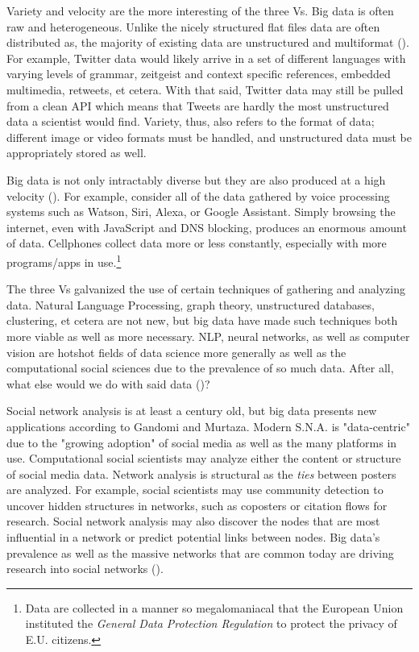 \documentclass[12pt, a4paper]{article}
\begin{document}
Variety and velocity are the more interesting of the three Vs. Big data is often raw and heterogeneous. Unlike the nicely structured flat files data are often distributed as, the majority of existing data are unstructured and multiformat (\cite{gandomiamir2015}). For example, Twitter data would likely arrive in a set of different languages with varying levels of grammar, zeitgeist and context specific references, embedded multimedia, retweets, et cetera. With that said, Twitter data may still be pulled from a clean API which means that Tweets are hardly the most unstructured data a scientist would find. Variety, thus, also refers to the format of data; different image or video formats must be handled, and unstructured data must be appropriately stored as well.

Big data is not only intractably diverse but they are also produced at a high velocity (\cite{gandomiamir2015}). For example, consider all of the data gathered by voice processing systems such as Watson, Siri, Alexa, or Google Assistant. Simply browsing the internet, even with JavaScript and DNS blocking, produces an enormous amount of data. Cellphones collect data more or less constantly, especially with more programs/apps in use.\footnote{Data are collected in a manner so megalomaniacal that the European Union instituted the \textit{General Data Protection Regulation} to protect the privacy of E.U. citizens.}

The three Vs galvanized the use of certain techniques of gathering and analyzing data. Natural Language Processing, graph theory, unstructured databases, clustering, et cetera are not new, but big data have made such techniques both more viable as well as more necessary. NLP, neural networks, as well as computer vision are hotshot fields of data science more generally as well as the computational social sciences due to the prevalence of so much data. After all, what else would we do with said data (\cite{gandomiamir2015})?

Social network analysis is at least a century old, but big data presents new applications according to Gandomi and Murtaza. Modern S.N.A. is "data-centric" due to the "growing adoption" of social media as well as the many platforms in use. Computational social scientists may analyze either the content or structure of social media data. Network analysis is structural as the \textit{ties} between posters are analyzed. For example, social scientists may use community detection to uncover hidden structures in networks, such as coposters or citation flows for research. Social network analysis may also discover the nodes that are most influential in a network or predict potential links between nodes. Big data's prevalence as well as the massive networks that are common today are driving research into social networks (\cite{gandomiamir2015}).
\end{document}
